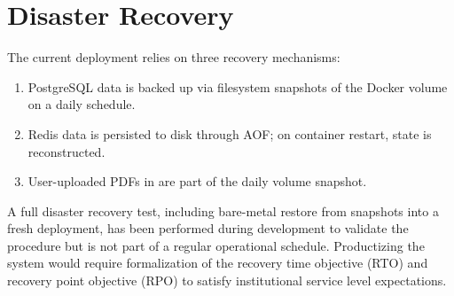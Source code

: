 \section{Disaster Recovery}

The current deployment relies on three recovery mechanisms:

\begin{enumerate}
    \item PostgreSQL data is backed up via filesystem snapshots of the Docker volume on a daily schedule.
    \item Redis data is persisted to disk through AOF; on container restart, state is reconstructed.
    \item User-uploaded PDFs in  are part of the daily volume snapshot.
\end{enumerate}

A full disaster recovery test, including bare-metal restore from snapshots into a fresh deployment, has been performed during development to validate the procedure but is not part of a regular operational schedule. Productizing the system would require formalization of the recovery time objective (RTO) and recovery point objective (RPO) to satisfy institutional service level expectations.
